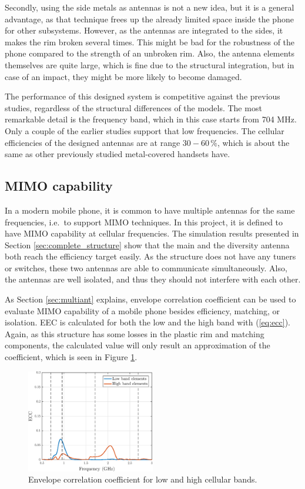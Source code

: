 Secondly, using the side metals as antennas is not a new idea, but it is a general advantage, as that technique frees up the already limited space inside the phone for other subsystems. However, as the antennas are integrated to the sides, it makes the rim broken several times. This might be bad for the robustness of the phone compared to the strength of an unbroken rim. Also, the antenna elements themselves are quite large, which is fine due to the structural integration, but in case of an impact, they might be more likely to become damaged.

The performance of this designed system is competitive against the previous studies, regardless of the structural differences of the models. The most remarkable detail is the frequency band, which in this case starts from 704 MHz. Only a couple of the earlier studies support that low frequencies. The cellular efficiencies of the designed antennas are at range $30-60\,\%$, which is about the same as other previously studied metal-covered handsets have. 


\subsection{MIMO capability}
\label{sec:mimo_cap}
In a modern mobile phone, it is common to have multiple antennas for the same frequencies, i.e.\ to support MIMO techniques. In this project, it is defined to have MIMO capability at cellular frequencies. The simulation results presented in Section \ref{sec:complete_structure} show that the main and the diversity antenna both reach the efficiency target easily. As the structure does not have any tuners or switches, these two antennas are able to communicate simultaneously. Also, the antennas are well isolated, and thus they should not interfere with each other.

As Section \ref{sec:multiant} explains, envelope correlation coefficient can be used to evaluate MIMO capability of a mobile phone besides efficiency, matching, or isolation. EEC is calculated for both the low and the high band with (\ref{eq:ecc}). Again, as this structure has some losses in the plastic rim and matching components, the calculated value will only result an approximation of the coefficient, which is seen in Figure \ref{fig:ecc}. 
\begin{figure}[H]
    \centering
    \includegraphics[width=0.5\textwidth]{img/ecc.eps}
    \caption{Envelope correlation coefficient for low and high cellular bands.}
    \label{fig:ecc}
\end{figure}

